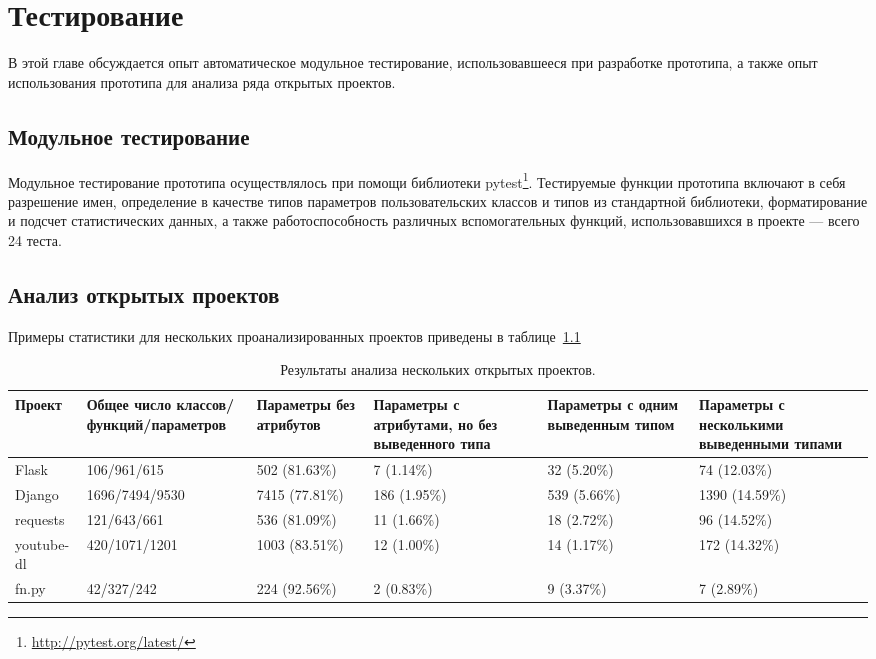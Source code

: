 \chapter{Тестирование}

В этой главе обсуждается опыт автоматическое модульное тестирование,
использовавшееся при разработке прототипа, а также опыт использования прототипа
для анализа ряда открытых проектов.

\section{Модульное тестирование}
\label{sec:unit-testing}
Модульное тестирование прототипа осуществлялось при помощи библиотеки
pytest\footnote{\url{http://pytest.org/latest/}}.
Тестируемые функции прототипа включают в себя разрешение имен, определение в
качестве типов параметров пользовательских классов и типов из стандартной библиотеки,
форматирование и подсчет статистических данных, а также работоспособность
различных вспомогательных функций, использовавшихся в проекте --- всего 24
теста. 

\section{Анализ открытых проектов}
\label{sec:projects-analysis}

Примеры статистики для нескольких проанализированных проектов приведены в
таблице~\ref{tab:statistic-results-1}

\begin{table}[H]
  \scriptsize
  \caption{Результаты анализа нескольких открытых проектов.}
  \label{tab:statistic-results-1}
  \begin{tabularx}{\textwidth}{ |X|X|X|X|X|X| }
    \hline
    Проект & Общее число классов/функций/параметров & Параметры без атрибутов &
    Параметры с атрибутами, но без выведенного типа & 
    Параметры с одним выведенным типом & 
    Параметры с несколькими выведенными типами \\ \hline

    Flask & 106/961/615 & 502 (81.63\%) & 7 (1.14\%) & 32 (5.20\%) & 74 (12.03\%)
    \\ \hline

    Django & 1696/7494/9530 & 7415 (77.81\%) & 186 (1.95\%) & 539 (5.66\%) &
    1390 (14.59\%)
    \\ \hline

    requests & 121/643/661 & 536 (81.09\%) & 11 (1.66\%) & 18 (2.72\%) & 96
    (14.52\%)
    \\ \hline

    youtube-dl & 420/1071/1201 & 1003 (83.51\%) & 12 (1.00\%) & 14 (1.17\%)
    & 172 (14.32\%)
    \\ \hline

    fn.py & 42/327/242 &  224 (92.56\%) & 2 (0.83\%) & 9 (3.37\%) & 7
    (2.89\%)
    \\ \hline

  \end{tabularx}
\end{table}

